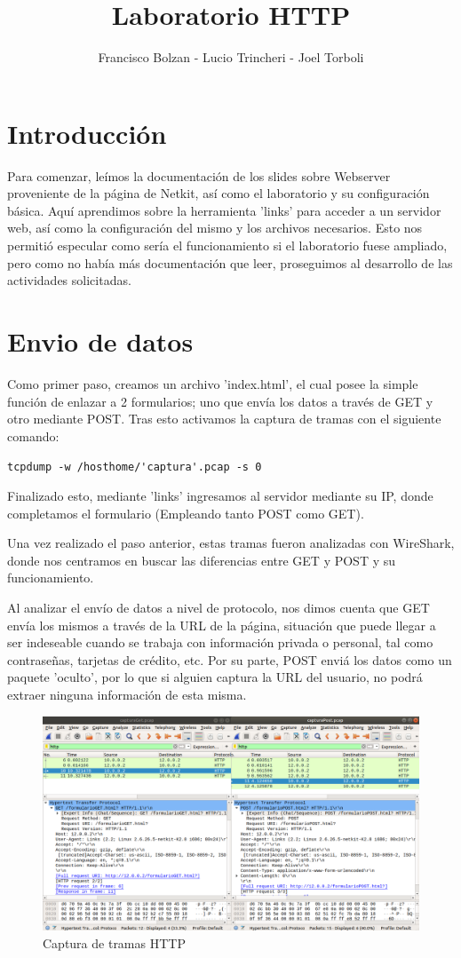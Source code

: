 \documentclass[12pt,a4paper]{article}
\title{Laboratorio HTTP}
\author{Francisco Bolzan - Lucio Trincheri - Joel Torboli}
\begin{document}
	\maketitle
	\section{Introducción}
	Para comenzar, leímos la documentación de los slides sobre Webserver proveniente de la página de Netkit, así como el laboratorio y su configuración básica. Aquí aprendimos sobre la herramienta 'links' para acceder a un servidor web, así como la configuración del mismo y los archivos necesarios. Esto nos permitió especular como sería el funcionamiento si el laboratorio fuese ampliado, pero como no había más documentación que leer, proseguimos al desarrollo de las actividades solicitadas.
	\section{Envio de datos}
	Como primer paso, creamos un archivo 'index.html', el cual posee la simple función de enlazar a 2 formularios; uno que envía los datos a través de GET y otro mediante POST.
	Tras esto activamos la captura de tramas con el siguiente comando: 
	
	\verb|tcpdump -w /hosthome/'captura'.pcap -s 0| 
	
	Finalizado esto, mediante 'links' ingresamos al servidor mediante su IP, donde completamos el formulario (Empleando tanto POST como GET).
	
	Una vez realizado el paso anterior, estas tramas fueron analizadas con WireShark, donde nos centramos en buscar las diferencias entre GET y POST y su funcionamiento.
	
	Al analizar el envío de datos a nivel de protocolo, nos dimos cuenta que GET envía los mismos a través de la URL de la página, situación que puede llegar a ser indeseable cuando se trabaja con información privada o personal, tal como contraseñas, tarjetas de crédito, etc. Por su parte, POST enviá los datos como un paquete 'oculto', por lo que si alguien captura la URL del usuario, no podrá extraer ninguna información de esta misma.
	
	\begin{figure}[H]
		\includegraphics[width=\linewidth]{getvspost.png}
		\caption{Captura de tramas HTTP}
		\label{fig:img1}
	\end{figure}
\end{document}
